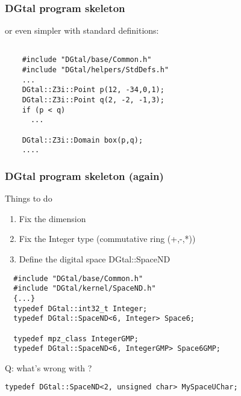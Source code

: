 \documentclass[8pt]{beamer}
\begin{document}
\begin{frame}[containsverbatim]
\frametitle{DGtal program skeleton}

or even simpler with standard definitions:

  \begin{lstlisting}
    
    #include "DGtal/base/Common.h"
    #include "DGtal/helpers/StdDefs.h"
    ...
    DGtal::Z3i::Point p(12, -34,0,1);
    DGtal::Z3i::Point q(2, -2, -1,3);
    if (p < q)
      ...
    
    DGtal::Z3i::Domain box(p,q);
    ....

  \end{lstlisting}
\end{frame}

\begin{frame}[containsverbatim]
  \frametitle{DGtal program skeleton (again)}

Things to do
  \begin{enumerate}
  \item Fix the dimension
  \item Fix the Integer type (commutative ring (+,-,*))
  \item Define the digital space DGtal::SpaceND
  \end{enumerate}


  
\begin{lstlisting}
  #include "DGtal/base/Common.h"
  #include "DGtal/kernel/SpaceND.h"
  {...}
  typedef DGtal::int32_t Integer;
  typedef DGtal::SpaceND<6, Integer> Space6;
  
  typedef mpz_class IntegerGMP;
  typedef DGtal::SpaceND<6, IntegerGMP> Space6GMP;
\end{lstlisting}

Q: what's wrong with ?
\begin{lstlisting}
typedef DGtal::SpaceND<2, unsigned char> MySpaceUChar;
\end{lstlisting}
\end{frame}
\end{document}

